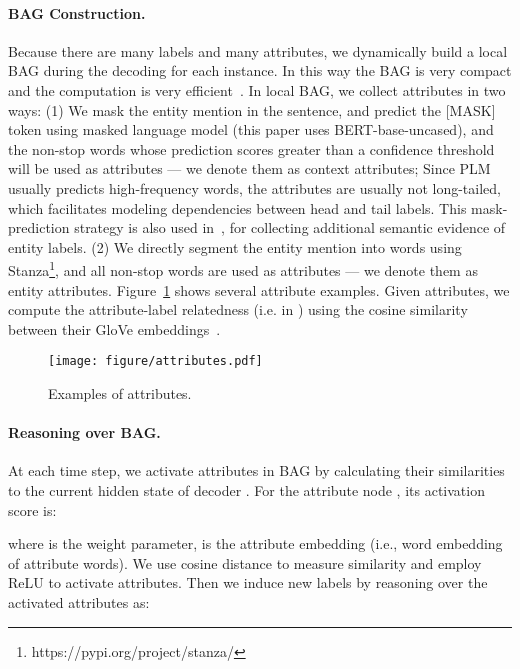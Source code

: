 \documentclass[11pt]{article}
\begin{document}
\paragraph{BAG Construction.}\label{collection} Because there are many labels and many attributes, we dynamically build a local BAG during the decoding for each instance. In this way the BAG is very compact and the computation is very efficient~\citep{DBLP:journals/ai/ZupanBDB99_attribute_reduce}. In local BAG, we collect attributes in two ways: (1) We mask the entity mention in the sentence, and predict the [MASK] token using masked language model (this paper uses BERT-base-uncased), and the non-stop words whose prediction scores greater than a confidence threshold  will be used as attributes --- we denote them as context attributes; Since PLM usually predicts high-frequency words, the attributes are usually not long-tailed, which facilitates modeling dependencies between head and tail labels. This mask-prediction strategy is also used in~\citet{DBLP:conf/emnlp/XinZH0S18_put_back}, for collecting additional semantic evidence of entity labels. (2) We directly segment the entity mention into words using Stanza\footnote{https://pypi.org/project/stanza/}, and all non-stop words are used as attributes --- we denote them as entity attributes. Figure~\ref{Fig.attributes} shows several attribute examples. Given attributes, we compute the attribute-label relatedness (i.e.  in ) using the cosine similarity between their GloVe embeddings~\citep{DBLP:conf/emnlp/PenningtonSM14_glove}. 
\begin{figure}[!t]
\vspace{-0cm}
\setlength{\belowcaptionskip}{-0.3cm}
\centering
\texttt{[image: figure/attributes.pdf]} 
\caption{Examples of attributes.}
\label{Fig.attributes} 
\end{figure}

\paragraph{Reasoning over BAG.} At each time step, we activate attributes in BAG by calculating their similarities to the current hidden state of decoder . For the  attribute node , its activation score is:

where  is the weight parameter,  is the attribute embedding (i.e., word embedding of attribute words). We use cosine distance to measure similarity and employ ReLU to activate attributes. Then we induce new labels by reasoning over the activated attributes as:
\end{document}
